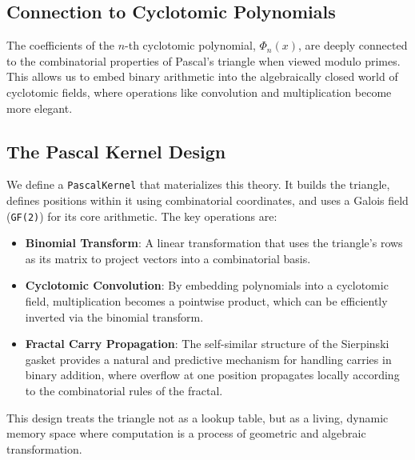 \subsection{Connection to Cyclotomic Polynomials}
The coefficients of the $n$-th cyclotomic polynomial, $\Phi_n(x)$, are deeply connected to the combinatorial properties of Pascal's triangle when viewed modulo primes. This allows us to embed binary arithmetic into the algebraically closed world of cyclotomic fields, where operations like convolution and multiplication become more elegant.

\subsection{The Pascal Kernel Design}
We define a \texttt{PascalKernel} that materializes this theory. It builds the triangle, defines positions within it using combinatorial coordinates, and uses a Galois field (\texttt{GF(2)}) for its core arithmetic. The key operations are:
\begin{itemize}
    \item \textbf{Binomial Transform}: A linear transformation that uses the triangle's rows as its matrix to project vectors into a combinatorial basis.
    \item \textbf{Cyclotomic Convolution}: By embedding polynomials into a cyclotomic field, multiplication becomes a pointwise product, which can be efficiently inverted via the binomial transform.
    \item \textbf{Fractal Carry Propagation}: The self-similar structure of the Sierpinski gasket provides a natural and predictive mechanism for handling carries in binary addition, where overflow at one position propagates locally according to the combinatorial rules of the fractal.
\end{itemize}

This design treats the triangle not as a lookup table, but as a living, dynamic memory space where computation is a process of geometric and algebraic transformation. 